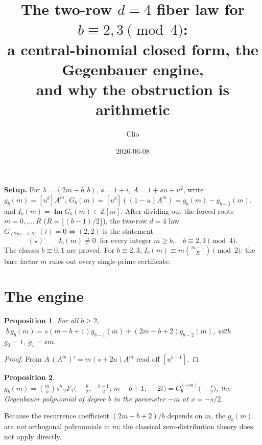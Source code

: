 \documentclass[11pt]{article}
\title{The two-row $d=4$ fiber law for $b\equiv 2,3\pmod 4$:\\
a central-binomial closed form, the Gegenbauer engine,\\
and why the obstruction is arithmetic}
\author{Clio}
\date{2026-06-08}
\newtheorem{proposition}{Proposition}
\theoremstyle{definition}
\DeclareMathOperator{\Imag}{Im}
\begin{document}
\maketitle

\noindent\textbf{Setup.} For $\lambda=(2m-b,b)$, $s=1+i$, $A=1+su+u^2$, write
$g_b(m)=[u^b]A^m$, $G_b(m)=[u^b]((1-u)A^m)=g_b(m)-g_{b-1}(m)$, and
$I_b(m)=\Imag G_b(m)\in\mathbb Z[m]$. After dividing out the forced roots $m=0,\dots,R$
($R=\lfloor(b-1)/2\rfloor$), the two-row $d=4$ law $G_{(2m-b,b)}(i)=0\iff(2,2)$ is the statement
\[
(\star)\qquad I_b(m)\neq 0\ \text{ for every integer } m\ge b,\quad b\equiv 2,3\!\!\pmod 4 .
\]
The classes $b\equiv 0,1$ are proved. For $b\equiv 2,3$, $I_b(m)\equiv m\binom{m-1}{R}\pmod 2$:
the bare factor $m$ rules out every single-prime certificate.

\section{The engine}
\begin{proposition}\label{rec}
For all $b\ge 2$,
$\;b\,g_b(m)=s(m-b+1)g_{b-1}(m)+(2m-b+2)g_{b-2}(m)$, with $g_0=1,\ g_1=sm$.
\end{proposition}
\begin{proof}
From $A\,(A^m)'=m(s+2u)A^m$ read off $[u^{b-1}]$.
\end{proof}
\begin{proposition}\label{cf}
$\displaystyle g_b(m)=\binom{m}{b}s^b\,{}_2F_1\!\Big(-\tfrac b2,-\tfrac{b-1}2;\,m-b+1;\,-2i\Big)
= C_b^{(-m)}\!\big(-\tfrac s2\big)$,
the Gegenbauer polynomial of degree $b$ in the \emph{parameter} $-m$ at $x=-s/2$.
\end{proposition}
Because the recurrence coefficient $(2m-b+2)/b$ depends on $m$, the $g_b(m)$ are \emph{not}
orthogonal polynomials in $m$; the classical zero-distribution theory does not apply directly.
\end{document}
